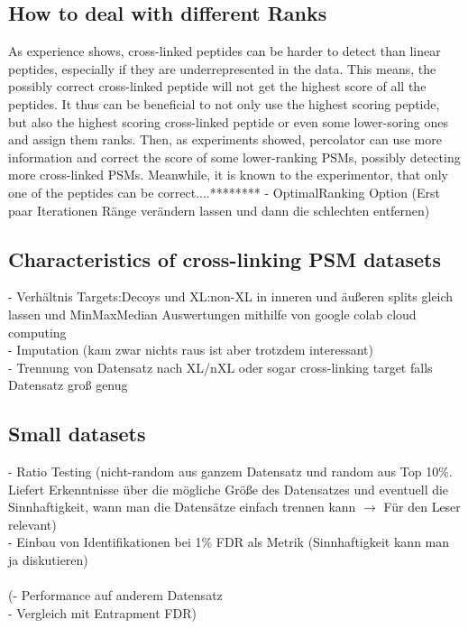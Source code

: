 \subsection{How to deal with different Ranks}
As experience shows, cross-linked peptides can be harder to detect than linear peptides, especially if they are underrepresented in the data. This means, the possibly correct cross-linked peptide will not get the highest score of all the peptides. It thus can be beneficial to not only use the highest scoring peptide, but also the highest scoring cross-linked peptide or even some lower-soring ones and assign them ranks. Then, as experiments showed, percolator can use more information and correct the score of some lower-ranking PSMs, possibly detecting more cross-linked PSMs. Meanwhile, it is known to the experimentor, that only one of the peptides can be correct....********
- OptimalRanking Option (Erst paar Iterationen Ränge verändern lassen und dann die schlechten entfernen)\\
\subsection{Characteristics of cross-linking PSM datasets}
- Verhältnis Targets:Decoys und XL:non-XL in inneren und äußeren splits gleich lassen und MinMaxMedian Auswertungen mithilfe von google colab cloud computing\\
- Imputation (kam zwar nichts raus ist aber trotzdem interessant)\\
- Trennung von Datensatz nach XL/nXL oder sogar cross-linking target falls Datensatz groß genug\\
\subsection{Small datasets}
- Ratio Testing (nicht-random aus ganzem Datensatz und random aus Top 10\%. Liefert Erkenntnisse über die mögliche Größe des Datensatzes und eventuell die Sinnhaftigkeit, wann man die Datensätze einfach trennen kann $\rightarrow$ Für den Leser relevant)\\
- Einbau von Identifikationen bei 1\% FDR als Metrik (Sinnhaftigkeit kann man ja diskutieren)\\\\			
(- Performance auf anderem Datensatz\\
- Vergleich mit Entrapment FDR)

